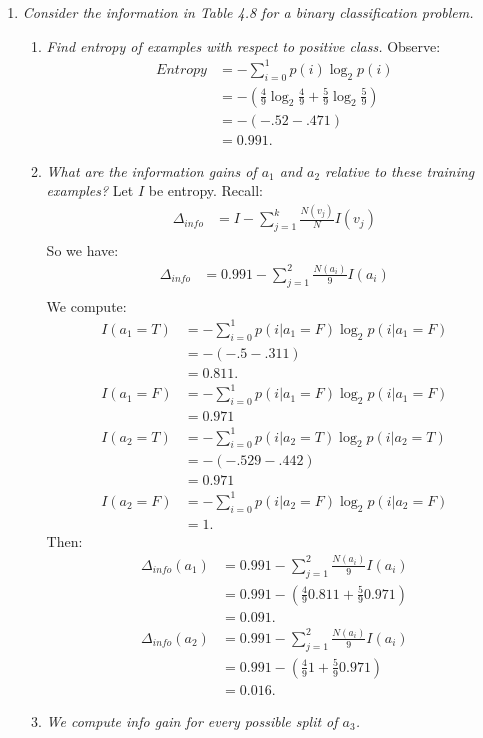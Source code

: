 \documentclass[12pt,oneside,reqno]{amsart}
\theoremstyle{plain}
\theoremstyle{definition}
\theoremstyle{remark}
\newcommand{\bee}{\begin{equation}\begin{aligned}}
\newcommand{\eee}{\end{aligned}\end{equation}}
\newcommand{\fracc}{\frac}
\newcommand{\lpar}{\left(}
\newcommand{\rpar}{\right)}
\begin{document}
\begin{enumerate}[label=\arabic*.]
\begin{enumerate}
\end{enumerate}

\item \textit{Consider the information in Table 4.8 for a binary classification problem. }

\begin{enumerate}
\item \textit{Find entropy of examples with respect to positive class. }
Observe:
\bee
Entropy &= -\sum_{i = 0}^1 p(i)\log_2 p(i)\\
&= -\lpar \fracc{4}{9}\log_2\fracc{4}{9}  + \fracc{5}{9}\log_2\fracc{5}{9}\rpar\\
&= -\lpar -.52 - .471 \rpar\\
&= 0.991.
\eee

\item \textit{What are the information gains of $a_1$ and $a_2$ relative to these training examples? }
Let $I$ be entropy. 
Recall:
\bee
\Delta_{info} &= I - \sum_{j = 1}^k \fracc{N(v_j)}{N}I(v_j)\\
\eee
So we have:
\bee
\Delta_{info} &= 0.991 - \sum_{j = 1}^2 \fracc{N(a_i)}{9}I(a_i)\\
\eee
We compute:
\bee
I(a_1 = T) &= -\sum_{i = 0}^1 p(i|a_1 = F)\log_2 p(i|a_1= F)\\
&= -\lpar -.5  - .311\rpar\\
&= 0.811.\\
I(a_1 = F) &= -\sum_{i = 0}^1 p(i|a_1=F)\log_2 p(i|a_1=F)\\
&= 0.971\\
I(a_2=T) &= -\sum_{i = 0}^1 p(i|a_2=T)\log_2 p(i|a_2=T)\\
&= -\lpar -.529  - .442\rpar\\
&= 0.971\\
I(a_2=F) &= -\sum_{i = 0}^1 p(i|a_2=F)\log_2 p(i|a_2=F)\\
&= 1.
\eee
Then:
\bee
\Delta_{info}(a_1) &= 0.991 - \sum_{j = 1}^2 \fracc{N(a_i)}{9}I(a_i)\\
&= 0.991 - \lpar \fracc{4}{9}0.811 + \fracc{5}{9}0.971 \rpar\\
&= 0.091.\\
\Delta_{info}(a_2) &= 0.991 - \sum_{j = 1}^2 \fracc{N(a_i)}{9}I(a_i)\\
&= 0.991 - \lpar \fracc{4}{9}1 + \fracc{5}{9}0.971 \rpar\\
&= 0.016.
\eee

\item \textit{We compute info gain for every possible split of $a_3$. }


\end{enumerate}
\end{enumerate}
\end{document}
